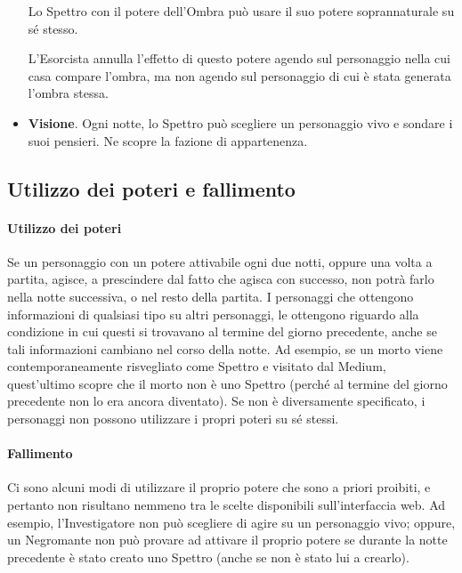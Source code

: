 \documentclass[a4paper,10pt]{article}
\begin{document}
\begin{itemize}
 Lo Spettro con il potere dell'Ombra può usare il suo potere soprannaturale su sé stesso.
 
 L'Esorcista annulla l'effetto di questo potere agendo sul personaggio nella cui casa compare l'ombra, ma non agendo sul personaggio di cui è stata generata l'ombra stessa.

 \item {\bf Visione}. Ogni notte, lo Spettro può scegliere un personaggio vivo e sondare i suoi pensieri. Ne scopre la fazione di appartenenza.
 
\end{itemize}


\subsection{Utilizzo dei poteri e fallimento}
\label{fallimento}

\paragraph{Utilizzo dei poteri} 
Se un personaggio con un potere attivabile ogni due notti, oppure una volta a partita, agisce, a prescindere dal fatto che agisca con successo, non potrà farlo nella notte successiva, o nel resto della partita.
I personaggi che ottengono informazioni di qualsiasi tipo su altri personaggi, le ottengono riguardo alla condizione in cui questi si trovavano al termine del giorno precedente, anche se tali informazioni cambiano nel corso della notte.
Ad esempio, se un morto viene contemporaneamente risvegliato come Spettro e visitato dal Medium, quest'ultimo scopre che il morto non è uno Spettro (perché al termine del giorno precedente non lo era ancora diventato).
Se non è diversamente specificato, i personaggi non possono utilizzare i propri poteri su sé stessi.

\paragraph{Fallimento} Ci sono alcuni modi di utilizzare il proprio potere che sono a priori proibiti, e pertanto non risultano nemmeno tra le scelte disponibili sull'interfaccia web. Ad esempio, l'Investigatore non può scegliere di agire su un personaggio vivo; oppure, un Negromante non può provare ad attivare il proprio potere se durante la notte precedente è stato creato uno Spettro (anche se non è stato lui a crearlo).
\end{document}
